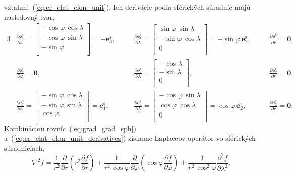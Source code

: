 \documentclass[a4paper, 12pt]{book}
\let\vec\mathbf
\begin{document}
vzťahmi~(\ref{eq:er_elat_elon_unit}).  Ich derivácie podľa sférických súradníc 
majú nasledovný tvar,
%
\begin{alignat}{3}
&\frac{\partial \vec e_1^\mathrm{s}}{\partial \varphi} =
%
\begin{bmatrix}
-\cos\varphi \, \cos\lambda\\
-\cos\varphi \, \sin\lambda\\
-\sin\varphi\\
\end{bmatrix}
%
= -\vec e_3^\mathrm{s}
%
{,}\quad
%
&&\frac{\partial \vec e_1^\mathrm{s}}{\partial \lambda} =
%
\begin{bmatrix}
 \sin\varphi \, \sin\lambda\\
-\sin\varphi \, \cos\lambda\\
0\\
\end{bmatrix}
%
= -\sin\varphi \, \vec e_2^\mathrm{s}
%
{,}\quad
%
&&\frac{\partial \vec e_1^\mathrm{s}}{\partial r} = \vec 0{,}\nonumber\\
%
\label{eq:er_elat_elon_unit_derivatives}
&\frac{\partial \vec e_2^\mathrm{s}}{\partial \varphi} = \vec 0{,}
%
&&\frac{\partial \vec e_2^\mathrm{s}}{\partial \lambda} =
%
\begin{bmatrix}
-\cos\lambda\\
-\sin\lambda\\
0\\
\end{bmatrix}
%
{,}
%
&&\frac{\partial \vec e_2^\mathrm{s}}{\partial r} = \vec 0{,}\\
%
&\frac{\partial \vec e_3^\mathrm{s}}{\partial \varphi} =
%
\begin{bmatrix}
-\sin\varphi \, \cos\lambda\\
-\sin\varphi \, \sin\lambda\\
\cos\varphi\\
\end{bmatrix}
%
= \vec e_1^\mathrm{s}
%
{,}
%
&&\frac{\partial \vec e_3^\mathrm{s}}{\partial \lambda} =
%
\begin{bmatrix}
-\cos\varphi \, \sin\lambda\\
 \cos\varphi \, \cos\lambda\\
0\\
\end{bmatrix}
%
= \cos\varphi \, \vec e_2^\mathrm{s}
%
{,}
%
&&\frac{\partial \vec e_3^\mathrm{s}}{\partial r} = \vec 0{.}
\nonumber
\end{alignat}
%
Kombináciou rovníc~(\ref{eq:grad_grad_sph}) 
a~(\ref{eq:er_elat_elon_unit_derivatives}) získame Laplaceov operátor vo 
sférických súradniciach,
%
\begin{equation}
\label{eq:laplace_sph}
\nabla^2 f = \frac{1}{r^2} \frac{\partial}{\partial r} \left( r^2
\frac{\partial f}{\partial r} \right) + \frac{1}{r^2 \, \cos\varphi}
\frac{\partial}{\partial \varphi} \left( \cos\varphi \frac{\partial f}{\partial 
\varphi} \right) + \frac{1}{r^2 \,
\cos^2\varphi}\frac{\partial^2 f}{\partial \lambda^2}{.}
\end{equation}
\end{document}
